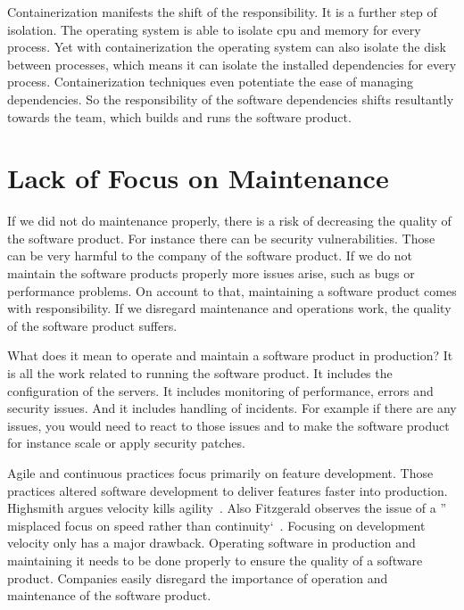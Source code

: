 Containerization manifests the shift of the responsibility. It is a further step of
isolation. The operating system is able to isolate cpu and memory for every process. Yet
with containerization the operating system can also isolate the disk between processes,
which means it can isolate the installed dependencies for every process. Containerization
techniques even potentiate the ease of managing dependencies. So the responsibility of the
software dependencies shifts resultantly towards the team, which builds and runs the
software product.


\section{Lack of Focus on Maintenance}

If we did not do maintenance properly, there is a risk of decreasing the quality of the
software product. For instance there can be security vulnerabilities. Those can be very
harmful to the company of the software product. If we do not maintain the software
products properly more issues arise, such as bugs or performance problems. On account to
that, maintaining a software product comes with responsibility. If we disregard
maintenance and operations work, the quality of the software product suffers.

What does it mean to operate and maintain a software product in production? It is all the
work related to running the software product. It includes the configuration of the
servers. It includes monitoring of performance, errors and security issues. And it
includes handling of incidents. For example if there are any issues, you would need to
react to those issues and to make the software product for instance scale or apply
security patches.

Agile and continuous practices focus primarily on feature development. Those practices
altered software development to deliver features faster into production. Highsmith argues
velocity kills agility~\cite{velocity_kills}. Also Fitzgerald observes the issue of a ''
misplaced focus on speed rather than continuity`~\cite{continuous_fitzgerald}. Focusing on
development velocity only has a major drawback. Operating software in production and
maintaining it needs to be done properly to ensure the quality of a software
product. Companies easily disregard the importance of operation and maintenance of the
software product.


